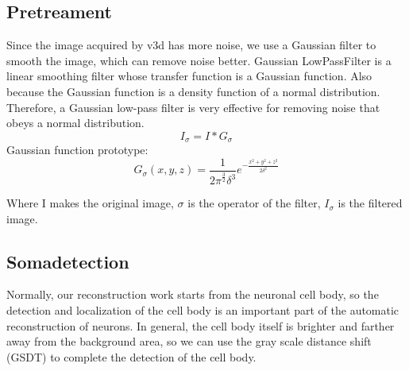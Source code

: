 \documentclass[runningheads]{llncs}
\begin{document}
\subsection{Pretreament}
Since the image acquired by v3d has more noise, we use a Gaussian filter to smooth the image, which can remove noise better.
Gaussian LowPassFilter is a linear smoothing filter whose transfer function is a Gaussian function. Also because the Gaussian function is a density function of a normal distribution. Therefore, a Gaussian low-pass filter is very effective for removing noise that obeys a normal distribution.
\begin{equation}
I_{\sigma}=I*G_{\sigma}
\end{equation}
Gaussian function prototype:
\begin{equation}
G_\sigma(x,y,z)=\frac{1}{{2\pi}^{\frac{3}{2}} \delta^3}e^{- \frac{x^2 +y^2+z^2}{2\delta^2}}
\end{equation}

Where I makes the original image, $\sigma$ is the operator of the filter, $I_\sigma$ is the filtered image.
\subsection{Somadetection}
Normally, our reconstruction work starts from the neuronal cell body, so the detection and localization of the cell body is an important part of the automatic reconstruction of neurons. In general, the cell body itself is brighter and farther away from the background area, so we can use the gray scale distance shift (GSDT) to complete the detection of the cell body.
\end{document}
